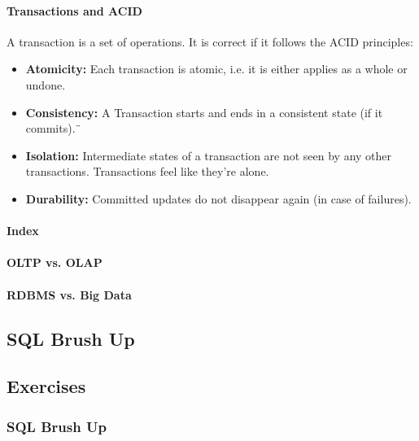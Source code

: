 \paragraph{Transactions and ACID}
A transaction is a set of operations. It is correct if it follows the ACID principles:
\begin{itemize}
    \item \textbf{Atomicity:} Each transaction is atomic, i.e. it is either applies as a whole or undone.
    \item \textbf{Consistency:} A Transaction starts and ends in a consistent state (if it commits).¨
    \item \textbf{Isolation:} Intermediate states of a transaction are not seen by any other transactions. Transactions feel like they're alone.
    \item \textbf{Durability:} Committed updates do not disappear again (in case of failures).
\end{itemize}

\paragraph{Index}

\paragraph{OLTP vs. OLAP}

\paragraph{RDBMS vs. Big Data}


\subsection{SQL Brush Up}






\subsection{Exercises}

\subsubsection{SQL Brush Up}